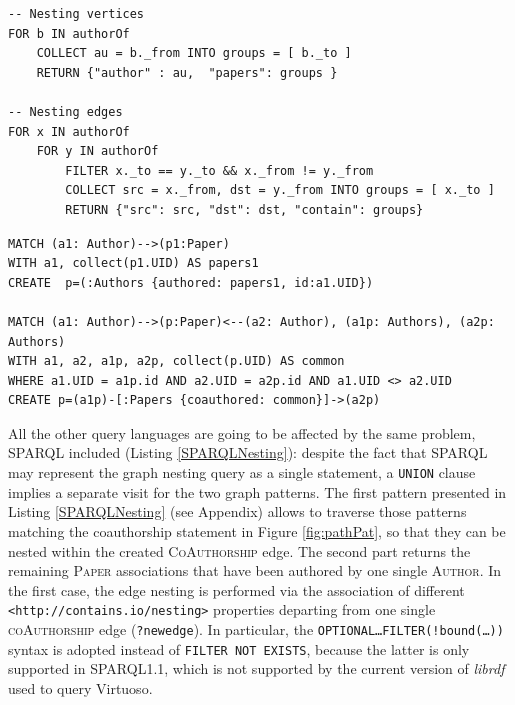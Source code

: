 \begin{lstfloat}[!p]
\begin{lstlisting}[caption={Graph Nesting in ArangoDB using AQL as a query lanugage. Please note that all the fields marked with an underscore represent externally indexed structures and. Therefore, only external indices are used within the query plan.},language=AQL,frameround=fttt,frame=trBL,tabsize=2,mathescape=true,label=AQLQueryNesting]
-- Nesting vertices
FOR b IN authorOf 
	COLLECT au = b._from INTO groups = [ b._to ] 
	RETURN {"author" : au,  "papers": groups }
	
-- Nesting edges
FOR x IN authorOf 
	FOR y IN authorOf 
		FILTER x._to == y._to && x._from != y._from 
		COLLECT src = x._from, dst = y._from INTO groups = [ x._to ] 
		RETURN {"src": src, "dst": dst, "contain": groups}
\end{lstlisting}
	
\begin{lstlisting}[caption={Graph Nesting in Neo4J using Cypher as a Query Language. Please note that, even in this case, is it not possible to return one single nested graph immediately, and hence the nested vertices must be created before creating the nested edges. This implies that a greater number of joins is required to associate the previously nested data to the original operand.},language=Cypher,frameround=fttt,frame=trBL,mathescape=true,label=Neo4JQuery]
MATCH (a1: Author)-->(p1:Paper) 
WITH a1, collect(p1.UID) AS papers1 
CREATE  p=(:Authors {authored: papers1, id:a1.UID})
	
MATCH (a1: Author)-->(p:Paper)<--(a2: Author), (a1p: Authors), (a2p: Authors)
WITH a1, a2, a1p, a2p, collect(p.UID) AS common
WHERE a1.UID = a1p.id AND a2.UID = a2p.id AND a1.UID <> a2.UID
CREATE p=(a1p)-[:Papers {coauthored: common}]->(a2p)
\end{lstlisting}
\end{lstfloat}


All the other query languages are going to be affected by the same problem, SPARQL included (Listing \ref{SPARQLNesting}): despite the fact that SPARQL  may represent the graph nesting query as a single statement, a \texttt{UNION} clause implies a separate visit for the two graph patterns. The first pattern presented in Listing \ref{SPARQLNesting} (see Appendix) allows to traverse those  patterns matching the coauthorship statement in Figure \ref{fig:pathPat}, so that they can be nested within the created \textsc{CoAuthorship} edge. The second part returns the remaining \textsc{Paper} associations that have been authored by one single \textsc{Author}. In the first case, the edge nesting is performed via the association of different \texttt{<http://contains.io/nesting>} properties departing from one single  \textsc{coAuthorship} edge (\texttt{?newedge}). In particular, the \texttt{OPTIONAL\dots FILTER(!bound(\dots))} syntax is adopted instead of \texttt{FILTER NOT EXISTS}, because the latter is only supported in SPARQL1.1, which is not supported by the current version of \textit{librdf} used to query Virtuoso.

